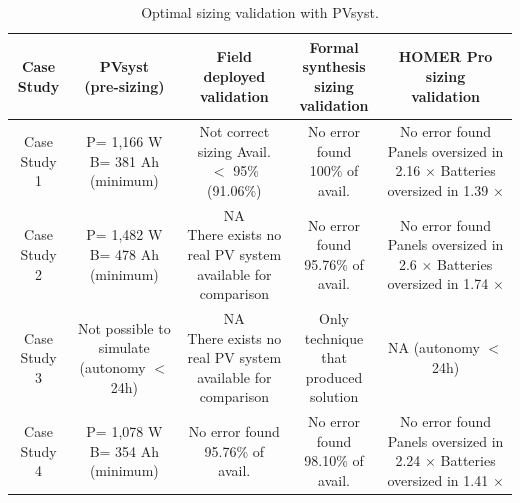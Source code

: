 \documentclass[a4paper,donotrepeattitle,fleqn]{cas-dc}
\begin{document}
%
\begin{table}
\centering
\caption{Optimal sizing validation with PVsyst.}
\label{tab2}
\begin{scriptsize}
\begin{tabular}{c|c|c|c|c}
\hline
\hline
Case Study & \makecell{PVsyst\\(pre-sizing)}& \makecell{Field\\deployed\\validation}& \makecell{Formal synthesis\\sizing\\validation}& \makecell{HOMER Pro\\sizing\\validation}\\
\hline
\hline
Case Study 1 & \makecell{P= 1,166 W\\B= 381 Ah\\(minimum)} & \makecell{Not correct sizing \\Avail. $<$ 95\%\\(91.06\%)} & \makecell{No error found \\100\% of avail.} & \makecell{No error found\\Panels oversized in 2.16 $\times$\\Batteries oversized in 1.39 $\times$}\\
\hline
Case Study 2 & \makecell{P= 1,482 W\\B= 478 Ah\\(minimum)} & \makecell{NA\\There exists no real PV system\\available for comparison} & \makecell{No error found \\95.76\% of avail.} & \makecell{No error found\\Panels oversized in 2.6 $\times$\\Batteries oversized in 1.74 $\times$}\\
\hline
Case Study 3 & \makecell{Not possible to \\simulate\\(autonomy $<$ 24h)} & \makecell{NA\\There exists no real PV system\\available for comparison} & \makecell{Only technique that\\produced solution} & \makecell{NA\\(autonomy $<$ 24h)}\\
\hline
Case Study 4 & \makecell{P= 1,078 W\\B= 354 Ah\\(minimum)} & \makecell{No error found \\95.76\% of avail.} & \makecell{No error found \\98.10\% of avail.} & \makecell{No error found\\Panels oversized in 2.24 $\times$\\Batteries oversized in 1.41 $\times$}\\

\end{tabular}
\end{scriptsize}
\end{table}
\end{document}
